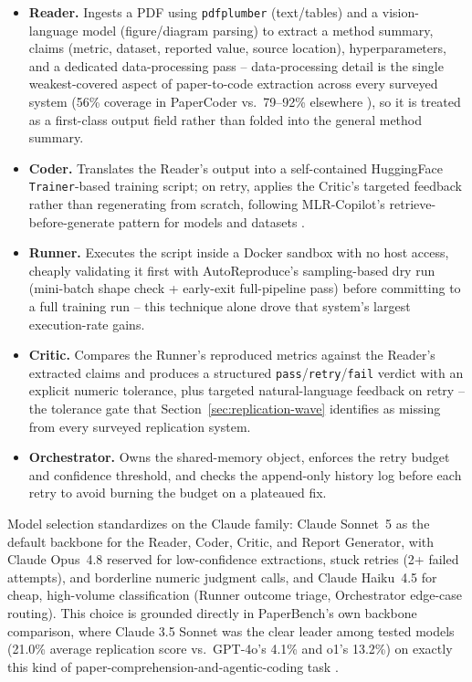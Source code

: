\documentclass[10pt,twocolumn]{article}
\begin{document}
\begin{itemize}
  \item \textbf{Reader.} Ingests a PDF using \texttt{pdfplumber} (text/tables) and a
  vision-language model (figure/diagram parsing) to extract a method summary, claims
  (metric, dataset, reported value, source location), hyperparameters, and a dedicated
  data-processing pass -- data-processing detail is the single weakest-covered aspect of
  paper-to-code extraction across every surveyed system (56\% coverage in PaperCoder vs.\
  79--92\% elsewhere \cite{seo2025papercoder}), so it is treated as a first-class output
  field rather than folded into the general method summary.
  \item \textbf{Coder.} Translates the Reader's output into a self-contained HuggingFace
  \texttt{Trainer}-based training script; on retry, applies the Critic's targeted
  feedback rather than regenerating from scratch, following MLR-Copilot's
  retrieve-before-generate pattern for models and datasets \cite{li2024mlrcopilot}.
  \item \textbf{Runner.} Executes the script inside a Docker sandbox with no host
  access, cheaply validating it first with AutoReproduce's sampling-based dry run
  (mini-batch shape check + early-exit full-pipeline pass) before committing to a full
  training run \cite{zhao2025autoreproduce} -- this technique alone drove that system's
  largest execution-rate gains.
  \item \textbf{Critic.} Compares the Runner's reproduced metrics against the Reader's
  extracted claims and produces a structured \texttt{pass}/\texttt{retry}/\texttt{fail}
  verdict with an explicit numeric tolerance, plus targeted natural-language feedback on
  retry -- the tolerance gate that Section~\ref{sec:replication-wave} identifies as
  missing from every surveyed replication system.
  \item \textbf{Orchestrator.} Owns the shared-memory object, enforces the retry budget
  and confidence threshold, and checks the append-only history log before each retry to
  avoid burning the budget on a plateaued fix.
\end{itemize}

Model selection standardizes on the Claude family: Claude Sonnet~5 as the default
backbone for the Reader, Coder, Critic, and Report Generator, with Claude Opus~4.8
reserved for low-confidence extractions, stuck retries (2+ failed attempts), and
borderline numeric judgment calls, and Claude Haiku~4.5 for cheap, high-volume
classification (Runner outcome triage, Orchestrator edge-case routing). This choice is
grounded directly in PaperBench's own backbone comparison, where Claude 3.5 Sonnet was
the clear leader among tested models (21.0\% average replication score vs.\ GPT-4o's
4.1\% and o1's 13.2\%) on exactly this kind of paper-comprehension-and-agentic-coding
task \cite{starace2025paperbench}.
\end{document}
